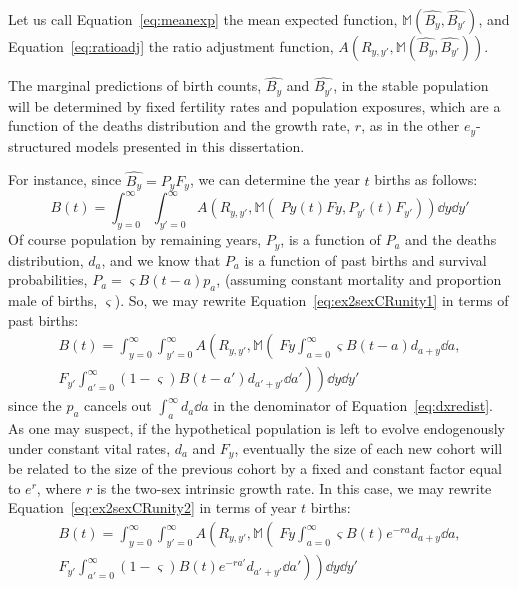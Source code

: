 Let us call Equation~\eqref{eq:meanexp} the mean
expected function, $\mathbb{M}(\widehat{B_y}, \widehat{B_{y'}})$, and
Equation~\eqref{eq:ratioadj} the ratio adjustment function, 
$A(R_{y,y'},\mathbb{M}(\widehat{B_y}, \widehat{B_{y'}}))$.

The marginal predictions of birth counts, $\widehat{B_y}$ and
$\widehat{B_{y'}}$, in the stable population will be determined by
fixed fertility rates and population exposures, which are a function of the
deaths distribution and the growth rate, $r$, as in the other $e_y$-structured 
models presented in this dissertation. 

For instance, since $\widehat{B_y} = P_yF_y$, we can determine the year $t$
births as follows:
\begin{equation}
\label{eq:ex2sexCRunity1}
B(t) = \int_{y=0}^\infty \int_{y'=0}^\infty
A\left(R_{y,y'},\mathbb{M}\left(\;Py(t)Fy, P_{y'}(t)F_{y'} \right)\right) \dd y
\dd y'
\end{equation} 
Of course population by remaining years, $P_y$, is a function of $P_a$ and the
deaths distribution, $d_a$, and we know that $P_a$ is a function of past births
and survival probabilities, $P_a = \varsigma B(t-a)p_a$, (assuming constant
mortality and proportion male of births, $\varsigma$). So, we may rewrite
Equation~\eqref{eq:ex2sexCRunity1} in terms of past births:
\begin{equation}
\label{eq:ex2sexCRunity2}
\begin{split}
B(t) = \int_{y=0}^\infty \int_{y'=0}^\infty
A\left(R_{y,y'},\mathbb{M}\left(\;Fy \int_{a=0}^\infty\varsigma
B(t-a)d_{a+y}\dd a,\right. \right. \\\left.
\left.F_{y'}\int_{a'=0}^\infty(1-\varsigma) B(t-a')d_{a'+y'} \dd a'\right)\right) \dd y \dd y'
\end{split}
\end{equation}
since the $p_a$ cancels out $\int _a^\infty d_a \dd a$ in the denominator of
Equation~\eqref{eq:dxredist}. As one may suspect, if the hypothetical
population is left to evolve endogenously under constant vital rates, $d_a$
and $F_y$, eventually the size of each new cohort will be related to the size
of the previous cohort by a fixed and constant factor equal to $e^r$, where
$r$ is the two-sex intrinsic growth rate. In this case, we may rewrite
Equation~\eqref{eq:ex2sexCRunity2} in terms of year $t$ births:
\begin{equation}
\label{eq:ex2sexCRunity3}
\begin{split}
B(t) = \int_{y=0}^\infty \int_{y'=0}^\infty
A\left(R_{y,y'},\mathbb{M}\left(\;Fy \int_{a=0}^\infty\varsigma
B(t)e^{-ra}d_{a+y}\dd a\right. \right., \\ \left.
\left.F_{y'}\int_{a'=0}^\infty(1-\varsigma) B(t)e^{-ra'}d_{a'+y'} \dd a'\right)\right) \dd y \dd y'
\end{split}
\end{equation}
